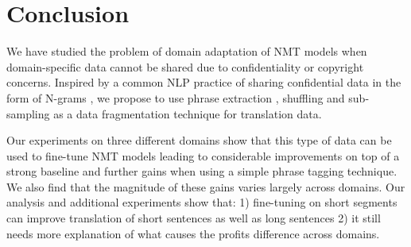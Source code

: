 \section{Conclusion}\label{section:conclusion}


We have studied the problem of domain adaptation of NMT models when domain-specific data cannot be shared due to confidentiality or copyright concerns. Inspired by a common NLP practice of sharing confidential data in the form of N-grams \parencite[]{michel2011quantitative}, we propose to use phrase extraction \parencite{koehn2003statistical}, shuffling and sub-sampling as a data fragmentation technique for translation data.

Our experiments on three different domains show that this type of data can be used to fine-tune NMT models leading to considerable improvements on top of a strong baseline and further gains when using a simple phrase tagging technique. We also find that the magnitude of these gains varies largely across domains. Our analysis and additional experiments show that: 1) fine-tuning on short segments can improve translation of short sentences as well as long sentences 2) it still needs more explanation of what causes the profits difference across domains.

